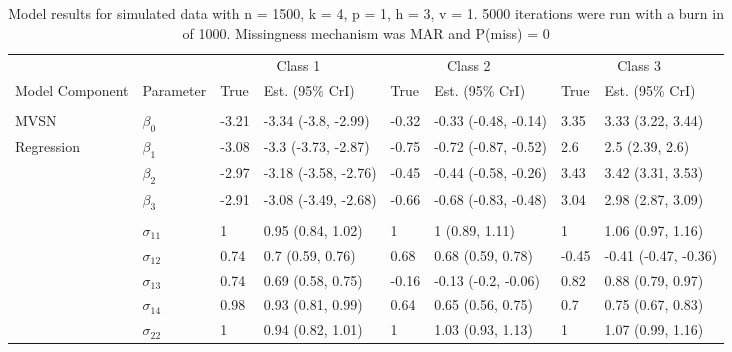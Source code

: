 \documentclass[useAMS,referee]{biom}
\begin{document}
\begin{table}[t]

\caption{\label{tab:unnamed-chunk-4}Model results for simulated data with n = 1500, k = 4, p = 1, h = 3, v = 1. 5000 iterations were run with a burn in of 1000. Missingness mechanism was MAR and P(miss) = 0}
\centering
\fontsize{8}{10}\selectfont
\begin{tabular}{llllllll}
\toprule
\multicolumn{2}{c}{ } & \multicolumn{2}{c}{Class 1} & \multicolumn{2}{c}{Class 2} & \multicolumn{2}{c}{Class 3} \\
\cmidrule(l{3pt}r{3pt}){3-4} \cmidrule(l{3pt}r{3pt}){5-6} \cmidrule(l{3pt}r{3pt}){7-8}
Model Component & Parameter & True & Est. (95\% CrI) & True & Est. (95\% CrI) & True & Est. (95\% CrI)\\
\midrule
\addlinespace[0.3em]
\multicolumn{8}{l}{\textbf{ }}\\
\hspace{1em}MVSN & $\beta_{0}$ & -3.21 & -3.34 (-3.8, -2.99) & -0.32 & -0.33 (-0.48, -0.14) & 3.35 & 3.33 (3.22, 3.44)\\
\hspace{1em}Regression & $\beta_{1}$ & -3.08 & -3.3 (-3.73, -2.87) & -0.75 & -0.72 (-0.87, -0.52) & 2.6 & 2.5 (2.39, 2.6)\\
\hspace{1em} & $\beta_{2}$ & -2.97 & -3.18 (-3.58, -2.76) & -0.45 & -0.44 (-0.58, -0.26) & 3.43 & 3.42 (3.31, 3.53)\\
\hspace{1em} & $\beta_{3}$ & -2.91 & -3.08 (-3.49, -2.68) & -0.66 & -0.68 (-0.83, -0.48) & 3.04 & 2.98 (2.87, 3.09)\\
\addlinespace[0.3em]
\multicolumn{8}{l}{\textbf{ }}\\
\hspace{1em} & $\sigma_{11}$ & 1 & 0.95 (0.84, 1.02) & 1 & 1 (0.89, 1.11) & 1 & 1.06 (0.97, 1.16)\\
\hspace{1em} & $\sigma_{12}$ & 0.74 & 0.7 (0.59, 0.76) & 0.68 & 0.68 (0.59, 0.78) & -0.45 & -0.41 (-0.47, -0.36)\\
\hspace{1em} & $\sigma_{13}$ & 0.74 & 0.69 (0.58, 0.75) & -0.16 & -0.13 (-0.2, -0.06) & 0.82 & 0.88 (0.79, 0.97)\\
\hspace{1em} & $\sigma_{14}$ & 0.98 & 0.93 (0.81, 0.99) & 0.64 & 0.65 (0.56, 0.75) & 0.7 & 0.75 (0.67, 0.83)\\
\hspace{1em} & $\sigma_{22}$ & 1 & 0.94 (0.82, 1.01) & 1 & 1.03 (0.93, 1.13) & 1 & 1.07 (0.99, 1.16)\\

\end{tabular}
\end{table}
\end{document}
